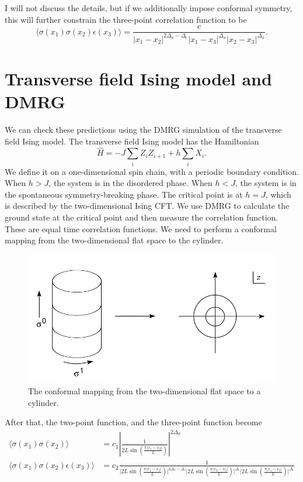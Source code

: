 \documentclass[prb,twocolumn,11pt]{revtex4-1}
\begin{document}
I will not discuss the details, but if we additionally impose conformal symmetry, this will further constrain the three-point correlation function to be 
\begin{equation}
\langle\sigma(x_1)\sigma(x_2)\epsilon(x_3)\rangle =\frac{c}{|x_1-x_2|^{2\Delta_{\sigma}-\Delta_{\epsilon}}|x_1-x_3|^{\Delta_{\sigma}}|x_2-x_3|^{\Delta_{\sigma}}}.
\end{equation}
\section{Transverse field Ising model and DMRG}
We can check these predictions using the DMRG simulation of the transverse field Ising model. 
The transverse field Ising model has the Hamiltonian
\begin{equation}
    \hat{H}=-J \sum_{i} Z_i Z_{i+1}+h \sum_i X_i.
\end{equation}
We define it on a one-dimensional spin chain, with a periodic boundary condition. When $h>J$, the system is in the disordered phase. When $h<J$, the system is in the spontaneous symmetry-breaking phase. The critical point is at $h=J$, which is described by the two-dimensional Ising CFT.
We use DMRG to calculate the ground state at the critical point and then measure the correlation function. These are equal time correlation functions. We need to perform a conformal mapping from the two-dimensional flat space to the cylinder.
\begin{figure}[htbp]
\centering
\includegraphics[scale=0.5]{conformal_mapping.png}
\caption{The conformal mapping from the two-dimensional flat space to a cylinder. }
\label{RG2chain}
\end{figure}
After that, the two-point function, and the three-point function become 
\begin{align}
    \langle\sigma(x_1)\sigma(x_2)\rangle& = c_1\left|\frac{1}{2L\sin(\frac{\pi|x_1-x_2|}{L})}\right|^{2\Delta_{\sigma}}\nonumber\\
\langle\sigma(x_1)\sigma(x_2)\epsilon(x_3)\rangle&=c_2 \frac{1}{\bigg|2L\sin(\frac{\pi|x_1-x_2|}{L})\bigg|^{2\Delta_\sigma-\Delta_\epsilon}\bigg|2L\sin(\frac{\pi|x_2-x_3|}{L})\bigg|^{\Delta_\epsilon}\bigg|2L\sin(\frac{\pi|x_1-x_3|}{L})\bigg|^{\Delta_\epsilon}}
\end{align}
\end{document}
